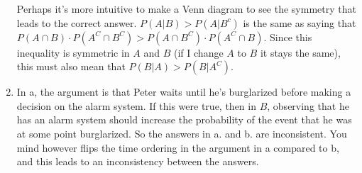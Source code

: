 \begin{exercise}[BH.2.10]
\begin{solution}
\begin{enumerate}
		Perhaps it's more intuitive to make a Venn diagram to see the symmetry that leads to the correct answer. $P(A|B)>P(A|B^c)$ is the same as saying that $P(A\cap B)\cdot P(A^{C}\cap  B^{C})>P(A\cap B^C)\cdot P(A^{C}\cap B)$.  Since this inequality is symmetric in $A$ and $B$ (if I change $A$ to $B$ it stays the same), this must also mean that $P(B|A)>P(B|A^{C})$.
		\item In a, the argument is that Peter waits until he's burglarized before making a decision on the alarm system. If this were true, then in $B$, observing that he has an alarm system should increase the probability of the event that he was at some point burglarized. So the answers in a. and b. are inconsistent. You mind however flips the time ordering in the argument in a compared to b, and this leads to an inconsistency between the answers.
	\end{enumerate}
\end{solution}
\end{exercise}

